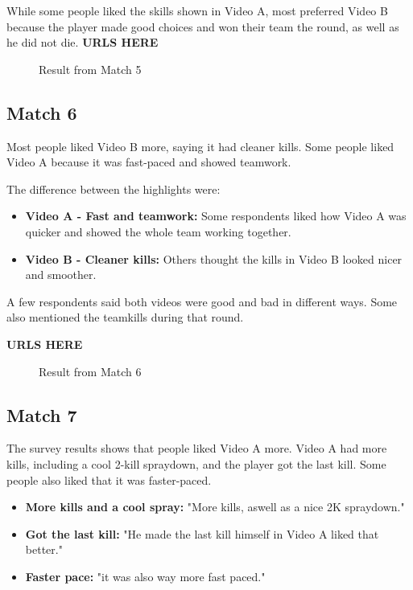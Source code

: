 While some people liked the skills shown in Video A, most preferred Video B because the player made good choices and won their team the round, as well as he did not die.
\textbf{URLS HERE}
\begin{figure}
\centering
{}
\caption{Result from Match 5}
\label{fig:match5}
\end{figure}
\subsection{Match 6}

Most people liked Video B more, saying it had cleaner kills. Some people liked Video A because it was fast-paced and showed teamwork.

The difference between the highlights were:
\begin{itemize}
\item \textbf{Video A - Fast and teamwork:} Some respondents liked how Video A was quicker and showed the whole team working together.
\item \textbf{Video B - Cleaner kills:} Others thought the kills in Video B looked nicer and smoother.
\end{itemize}

A few respondents said both videos were good and bad in different ways. Some also mentioned the teamkills during that round.

\textbf{URLS HERE}
\begin{figure}
\centering
{}
\caption{Result from Match 6}
\label{fig:match6}
\end{figure}
\subsection{Match 7}
The survey results shows that people liked Video A more. Video A had more kills, including a cool 2-kill spraydown, and the player got the last kill. Some people also liked that it was faster-paced.

\begin{itemize}
\item \textbf{More kills and a cool spray:} "More kills, aswell as a nice 2K spraydown."
\item \textbf{Got the last kill:} "He made the last kill himself in Video A liked that better."
\item \textbf{Faster pace:} "it was also way more fast paced."
\end{itemize}

